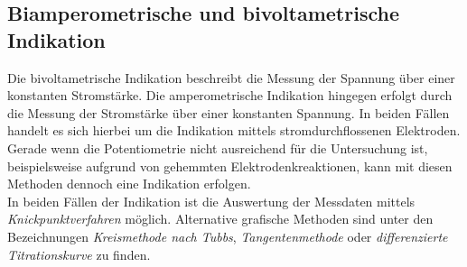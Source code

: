 \subsection*{Biamperometrische und bivoltametrische Indikation}
Die bivoltametrische Indikation beschreibt die Messung der Spannung über einer konstanten Stromstärke. Die amperometrische Indikation hingegen erfolgt durch die Messung der Stromstärke über einer konstanten Spannung. In beiden Fällen handelt es sich hierbei um die Indikation mittels stromdurchflossenen Elektroden. Gerade wenn die Potentiometrie nicht ausreichend für die Untersuchung ist, beispielsweise aufgrund von gehemmten Elektrodenkreaktionen, kann mit diesen Methoden dennoch eine Indikation erfolgen.\\
In beiden Fällen der Indikation ist die Auswertung der Messdaten mittels \textit{Knickpunktverfahren} möglich. Alternative grafische Methoden sind unter den Bezeichnungen \textit{Kreismethode nach Tubbs}, \textit{Tangentenmethode} oder \textit{differenzierte Titrationskurve} zu finden.

